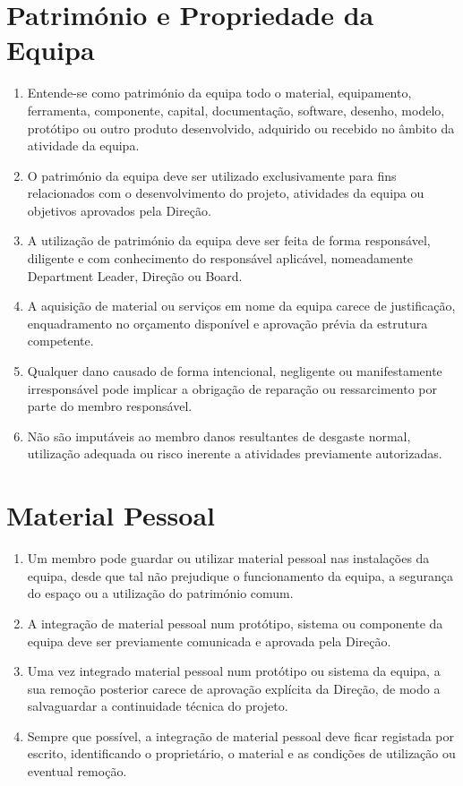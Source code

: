 \section{Património e Propriedade da Equipa}
\begin{enumerate}
  \item Entende-se como património da equipa todo o material, equipamento, ferramenta, componente, capital, documentação, software, desenho, modelo, protótipo ou outro produto desenvolvido, adquirido ou recebido no âmbito da atividade da equipa.
  \item O património da equipa deve ser utilizado exclusivamente para fins relacionados com o desenvolvimento do projeto, atividades da equipa ou objetivos aprovados pela Direção.
  \item A utilização de património da equipa deve ser feita de forma responsável, diligente e com conhecimento do responsável aplicável, nomeadamente Department Leader, Direção ou Board.
  \item A aquisição de material ou serviços em nome da equipa carece de justificação, enquadramento no orçamento disponível e aprovação prévia da estrutura competente.
  \item Qualquer dano causado de forma intencional, negligente ou manifestamente irresponsável pode implicar a obrigação de reparação ou ressarcimento por parte do membro responsável.
  \item Não são imputáveis ao membro danos resultantes de desgaste normal, utilização adequada ou risco inerente a atividades previamente autorizadas.
\end{enumerate}

\section{Material Pessoal}
\begin{enumerate}
  \item Um membro pode guardar ou utilizar material pessoal nas instalações da equipa, desde que tal não prejudique o funcionamento da equipa, a segurança do espaço ou a utilização do património comum.
  \item A integração de material pessoal num protótipo, sistema ou componente da equipa deve ser previamente comunicada e aprovada pela Direção.
  \item Uma vez integrado material pessoal num protótipo ou sistema da equipa, a sua remoção posterior carece de aprovação explícita da Direção, de modo a salvaguardar a continuidade técnica do projeto.
  \item Sempre que possível, a integração de material pessoal deve ficar registada por escrito, identificando o proprietário, o material e as condições de utilização ou eventual remoção.
\end{enumerate}

